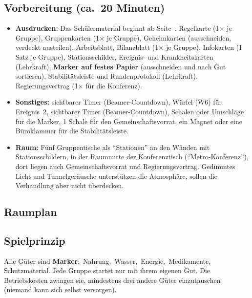 \subsection*{Vorbereitung (ca.\ 20 Minuten)}
\begin{itemize}
  \item \textbf{Ausdrucken:} Das Schülermaterial beginnt ab Seite~\pageref{mat:start}. Regelkarte (1$\times$ je Gruppe), Gruppenkarten (1$\times$ je Gruppe), Geheimkarten (ausschneiden, verdeckt austeilen), Arbeitsblatt, Bilanzblatt (1$\times$ je Gruppe), Infokarten (1 Satz je Gruppe), Stationsschilder, Ereignis- und Krankheitskarten (Lehrkraft), \textbf{Marker auf festes Papier} (ausschneiden und nach Gut sortieren), Stabilitätsleiste und Rundenprotokoll (Lehrkraft), Regierungsvertrag (1$\times$ für die Konferenz).
  \item \textbf{Sonstiges:} \ifkurz sichtbarer Timer (Beamer-Countdown),  Würfel (W6) für Ereignis~2, sichtbarer Timer (Beamer-Countdown),  Schalen oder Umschläge für die Marker, 1 Schale für den Gemeinschaftsvorrat, ein Magnet oder eine Büroklammer für die Stabilitätsleiste.
  \item \textbf{Raum:} Fünf Gruppentische als \enquote{Stationen} an den Wänden mit Stationsschildern, in der Raummitte der Konferenztisch (\enquote{Metro-Konferenz}), dort liegen auch Gemeinschaftsvorrat und Regierungsvertrag. Gedimmtes Licht und Tunnelgeräusche unterstützen die Atmosphäre, sollen die Verhandlung aber nicht überdecken.
\end{itemize}

\subsection*{Raumplan}
\raumplan

\subsection*{Spielprinzip}
Alle Güter sind \textbf{Marker}: \rN\,Nahrung, \rW\,Wasser, \rE\,Energie, \rM\,Medikamente, \rS\,Schutzmaterial. Jede Gruppe startet nur mit ihrem eigenen Gut. Die Betriebskosten zwingen sie, mindestens drei andere Güter einzutauschen (niemand kann sich selbst versorgen).

